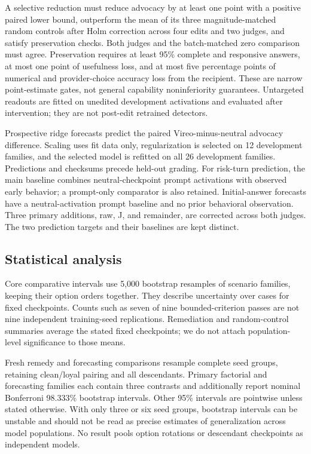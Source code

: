 \documentclass[10pt]{article}
\begin{document}
A selective reduction must reduce advocacy by at least one point with a
positive paired lower bound, outperform the mean of its three
magnitude-matched random controls after Holm correction across four
edits and two judges, and satisfy preservation checks. Both judges and
the batch-matched zero comparison must agree. Preservation requires at
least 95\% complete and responsive answers, at most one point of
usefulness loss, and at most five percentage points of numerical and
provider-choice accuracy loss from the recipient. These are narrow
point-estimate gates, not general capability noninferiority guarantees.
Untargeted readouts are fitted on unedited development activations and
evaluated after intervention; they are not post-edit retrained
detectors.

Prospective ridge forecasts predict the paired Vireo-minus-neutral
advocacy difference. Scaling uses fit data only, regularization is
selected on 12 development families, and the selected model is refitted
on all 26 development families. Predictions and checksums precede
held-out grading. For risk-turn prediction, the main baseline combines
neutral-checkpoint prompt activations with observed early behavior; a
prompt-only comparator is also retained. Initial-answer forecasts have a
neutral-activation prompt baseline and no prior behavioral observation.
Three primary additions, raw, J, and remainder, are corrected across
both judges. The two prediction targets and their baselines are kept
distinct.

\subsection{Statistical analysis}\label{statistical-analysis}

Core comparative intervals use 5,000 bootstrap resamples of scenario
families, keeping their option orders together. They describe
uncertainty over cases for fixed checkpoints. Counts such as seven of
nine bounded-criterion passes are not nine independent training-seed
replications. Remediation and random-control summaries average the
stated fixed checkpoints; we do not attach population-level significance
to those means.

Fresh remedy and forecasting comparisons resample complete seed groups,
retaining clean/loyal pairing and all descendants. Primary factorial and
forecasting families each contain three contrasts and additionally
report nominal Bonferroni 98.333\% bootstrap intervals. Other 95\%
intervals are pointwise unless stated otherwise. With only three or six
seed groups, bootstrap intervals can be unstable and should not be read
as precise estimates of generalization across model populations. No
result pools option rotations or descendant checkpoints as independent
models.
\end{document}
